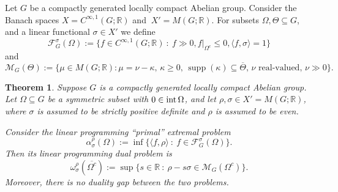 \documentclass[[a4paper,english,12pt]{amsart}
\theoremstyle{plain}
\newtheorem{theorem}{Theorem}[section]
\theoremstyle{remark}
\newcommand\supp{\operatorname{supp}}
\newcommand{\intt}{\mbox{\rm int\,}}
\newcommand{\FF}{\mathcal{F}}
\newcommand{\MM}{\mathcal{M}}
\newcommand{\RR}{\mathbb R}
\newcommand{\si}{\sigma}
\newcommand{\rh}{\rho}
\begin{document}
 Let $G$ be a compactly generated locally compact  Abelian group. Consider the Banach spaces $X=C^{\infty,1}(G;\RR)$ and $\ X'=M(G;\RR)$.
 For subsets $\Omega, \Theta\subseteq G$, and a linear functional $\si\in X'$ we define
 \[
\FF_G^\si(\Omega):= \{ f \in C^{\infty,1}(G;\RR) ~:~ f \gg 0, f|_{\Omega^c} \le 0, \langle f,\si \rangle =1 \}
\]
and 
\[
\MM_G(\Theta):= \{ \mu \in M(G;\RR): \mu=\nu-\kappa, \, \kappa\geq 0, \,  \supp(\kappa)\subseteq  \overline{\Theta}, \, \text{$\nu$ real-valued, }\nu \gg 0\} .
\]
\begin{theorem}\label{thm:main}
	Suppose  $G$ is a compactly generated locally compact  Abelian group. Let $\Omega\subseteq G$ be a symmetric subset with $0\in \intt \Omega$, and let $\rh,\si\in X'=M(G;\RR)$, where  $\si$ is assumed to be  strictly positive definite and $\rh$ is assumed to be even.

Consider the linear programming ``primal'' extremal problem
\[
\alpha_\si^\rh (\Omega):= \inf \{\langle f,\rh\rangle~:~f \in \FF_G^\si(\Omega)\}.
\]
Then its linear programming dual problem is
\[
\omega_\si^\rh(\overline{\Omega^c}):= \sup \{ s \in \RR ~:~\rh- s \si  \in \MM_G(\Omega^c) \}.
\]
Moreover, there is no duality gap between the two problems.
\end{theorem}
\end{document}
